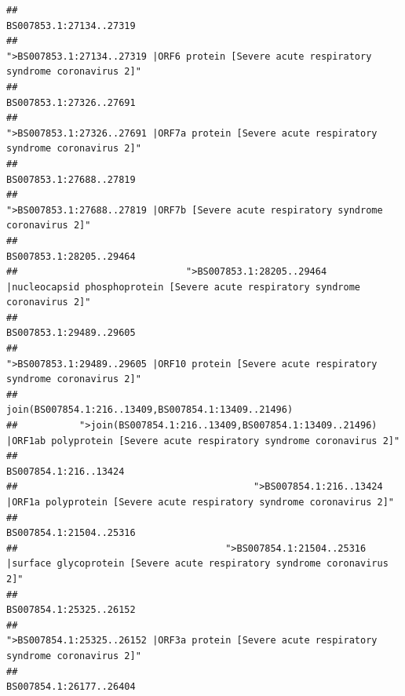 \documentclass[
]{article}
\begin{document}
\begin{verbatim}
##                                                                                                                BS007853.1:27134..27319 
##                                             ">BS007853.1:27134..27319 |ORF6 protein [Severe acute respiratory syndrome coronavirus 2]" 
##                                                                                                                BS007853.1:27326..27691 
##                                            ">BS007853.1:27326..27691 |ORF7a protein [Severe acute respiratory syndrome coronavirus 2]" 
##                                                                                                                BS007853.1:27688..27819 
##                                                    ">BS007853.1:27688..27819 |ORF7b [Severe acute respiratory syndrome coronavirus 2]" 
##                                                                                                                BS007853.1:28205..29464 
##                              ">BS007853.1:28205..29464 |nucleocapsid phosphoprotein [Severe acute respiratory syndrome coronavirus 2]" 
##                                                                                                                BS007853.1:29489..29605 
##                                            ">BS007853.1:29489..29605 |ORF10 protein [Severe acute respiratory syndrome coronavirus 2]" 
##                                                                                    join(BS007854.1:216..13409,BS007854.1:13409..21496) 
##           ">join(BS007854.1:216..13409,BS007854.1:13409..21496) |ORF1ab polyprotein [Severe acute respiratory syndrome coronavirus 2]" 
##                                                                                                                  BS007854.1:216..13424 
##                                          ">BS007854.1:216..13424 |ORF1a polyprotein [Severe acute respiratory syndrome coronavirus 2]" 
##                                                                                                                BS007854.1:21504..25316 
##                                     ">BS007854.1:21504..25316 |surface glycoprotein [Severe acute respiratory syndrome coronavirus 2]" 
##                                                                                                                BS007854.1:25325..26152 
##                                            ">BS007854.1:25325..26152 |ORF3a protein [Severe acute respiratory syndrome coronavirus 2]" 
##                                                                                                                BS007854.1:26177..26404 

\end{verbatim}
\end{document}
